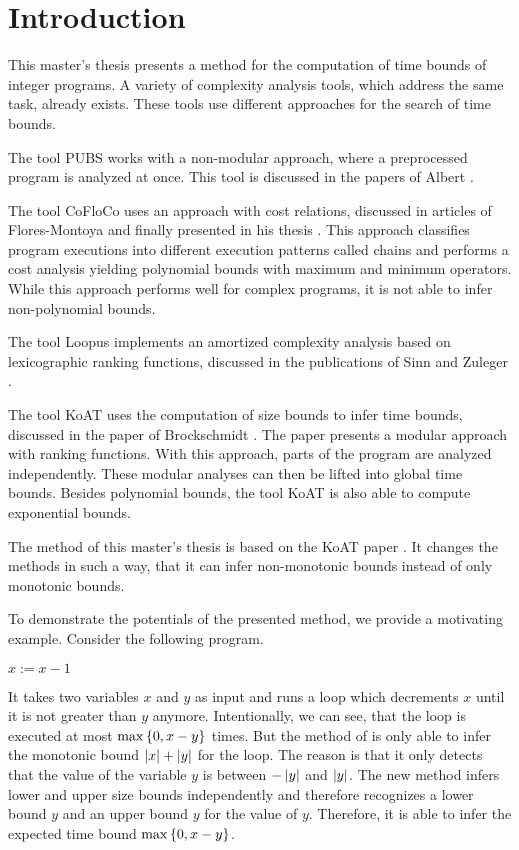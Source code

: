 \section{Introduction}

This master's thesis presents a method for the computation of time bounds of integer programs.
A variety of complexity analysis tools, which address the same task, already exists.
These tools use different approaches for the search of time bounds.

The tool PUBS works with a non-modular approach, where a preprocessed program is analyzed at once.
This tool is discussed in the papers of Albert \cite{pubs1, pubs2}.

The tool CoFloCo uses an approach with cost relations, discussed in articles of Flores-Montoya \cite{cofloco1, cofloco2, cofloco4} and finally presented in his thesis \cite{cofloco3}.
This approach classifies program executions into different execution patterns called chains and performs a cost analysis yielding polynomial bounds with maximum and minimum operators. 
While this approach performs well for complex programs, it is not able to infer non-polynomial bounds.

The tool Loopus implements an amortized complexity analysis based on lexicographic ranking functions, discussed in the publications of Sinn and Zuleger \cite{loopus1, loopus2}.

The tool KoAT uses the computation of size bounds to infer time bounds, discussed in the paper of Brockschmidt \cite{koat}.
The paper presents a modular approach with ranking functions.
With this approach, parts of the program are analyzed independently.
These modular analyses can then be lifted into global time bounds.
Besides polynomial bounds, the tool KoAT \cite{koat} is also able to compute exponential bounds.

The method of this master's thesis is based on the KoAT paper \cite{koat}.
It changes the methods in such a way, that it can infer non-monotonic bounds instead of only monotonic bounds.

To demonstrate the potentials of the presented method, we provide a motivating example.
Consider the following program.

\begin{algorithmic}
    \State $x := x - 1$
  \EndWhile
\end{algorithmic}

It takes two variables $x$ and $y$ as input and runs a loop which decrements $x$ until it is not greater than $y$ anymore.
Intentionally, we can see, that the loop is executed at most $\max \left\lbrace 0, x-y \right\rbrace$ times.
But the method of \cite{koat} is only able to infer the monotonic bound $\left|x\right|+\left|y\right|$ for the loop.
The reason is that it only detects that the value of the variable $y$ is between $-\left|y\right|$ and $\left|y\right|$.
The new method infers lower and upper size bounds independently and therefore recognizes a lower bound $y$ and an upper bound $y$ for the value of $y$.
Therefore, it is able to infer the expected time bound $\max \left\lbrace 0, x-y \right\rbrace$.

